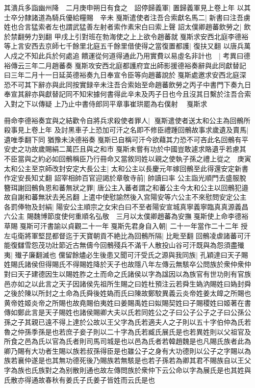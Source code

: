其潰兵多詣幽州降　二月庚申朔日有食之　詔停歸義軍|{
	置歸義軍見上卷上年}
以其士卒分隸諸道為騎兵優給糧賜　辛未戛斯遣使者注吾合索獻名馬二|{
	新書曰注吾虜姓也合言猛索者左也謂武猛善左射者索作素宋白曰索上聲}
詔太僕卿趙蕃飲勞之|{
	飲於禁翻勞力到翻}
甲戌上引對班在勃海使之上上欲令趙蕃就戛斯求安西北庭李德裕等上言安西去京師七千餘里北庭五千餘里借使得之當復置都護|{
	復扶又翻}
以唐兵萬人戍之不知此兵於何處追饋運從何道得通此乃用實費以易虛名非計也　|{
	考異曰德裕傳云三年二月趙蕃奏戛斯攻安西北庭都護府宜出師影援德裕奏辭與此同獻替記曰三年二月十一日延英德裕奏九日奉宣令臣等向趙蕃說於戛斯處邀求安西北庭深恐不可其下辭亦與此同按實録辛未注吾合索始至命趙蕃飲勞之丙子中書門下奏九日奉宣其辭亦與獻替記同不知宋據何書得此辛未及丙子日也今且沒其日繫於注吾合索入對之下以傳疑}
上乃止中書侍郎同平章事崔珙罷為右僕射　戛斯求

冊命李德裕奏宜與之結歡令自將兵求殺使者罪人|{
	戛斯遣使者送太和公主為回鶻所殺事見上卷上年}
及討黑車子上恐加可汗之名即不修臣禮踵回鶻故事求歲遺及賣馬|{
	遺唯季翻下同}
猶豫未決德裕奏戛斯已自稱可汗今欲藉其力恐不可吝此名回鶻有平安史之功故歲賜絹二萬匹且與之和市戛斯未嘗有功於中國豈敢遽求賂遺乎若慮其不臣當與之約必如回鶻稱臣乃行冊命又當敘同姓以親之使執子孫之禮上從之　庚寅太和公主至京師改封安定大長公主|{
	太和公主以長慶元年嫁回鶻至此得還安定新書作定安長知丈翻}
詔宰相帥百官迎謁於章敬寺前|{
	帥讀曰率}
公主詣光順門去盛服脫簪珥謝回鶻負恩和蕃無狀之罪|{
	唐公主入蕃者謂之和蕃公主今太和公主以回鶻犯邉故自謝和蕃無狀去羌呂翻}
上遣中使慰諭然後入宫陽安等六公主不來慰問安定公主各罰俸物及封絹|{
	陽安公主順宗之女宋白曰不至者陽安宣城真寧義寧臨真真源義昌六公主}
賜魏博節度使何重順名弘敬　三月以太僕卿趙蕃為安撫戛斯使上命李德裕草賜戛斯可汗書諭以貞觀二十一年戛斯先君身自入朝|{
	二十一年當作二十二年}
授左屯衛將軍堅昆都督迄于天寶朝貢不絶比為回鶻所隔|{
	比毗至翻}
回鶻凌虐諸蕃可汗能復讎雪怨茂功壯節近古無儔今回鶻殘兵不滿千人散投山谷可汗既與為怨須盡殱夷|{
	殱子廉翻滅也}
儻留餘燼必生後患又聞可汗受氏之源與我同族|{
	孔穎達曰天子賜姓賜氏諸侯但得賜氏不得賜姓降於天子也故隱八年左傳云無駭卒公問族於衆仲衆仲對曰天子建德因生以賜姓胙之土而命之氏諸侯以字為諡因以為族官有世功則有官族邑亦如之以此言之天子因諸侯先祖所生賜之曰姓杜預注云若舜生媯汭賜姓曰媯封舜之後於陳以所封之土命為氏舜後姓媯而氏曰陳故鄭駮異義云炎帝姓姜太皥之所賜也黄帝姓姬炎帝之所賜也故堯賜伯夷姓曰姜賜禹姓曰姒賜契姓曰子賜稷姓曰姬著在書傳如鄭此言是天子賜姓也諸侯賜卿大夫以氏若同姓公之子曰公子公子之子曰公孫公孫之子其親已遠不得上達於公故以王父字為氏若適夫人之子則以五十字伯仲為氏若魯之仲孫季孫是也若庶子妾子則以二十字為氏若臧氏展氏是也若異姓則以父祖官及所食之邑為氏以官為氏者則司馬司城是也以邑為氏者若韓趙魏是也凡賜氏族者此為卿乃賜有大功者生賜以族若叔孫得臣是也雖公子之身有大功德則以公子之字賜以為族若襄仲遂是也其無功德死後乃賜族若無駭是也若子孫若為卿其君不賜族自以王父字為族也氏族對之為别散則通也故左傳問族於衆仲下云公命以字為展氏是也其姓與氏散亦得通故春秋有姜氏子氏姜子皆姓而云氏是也}
